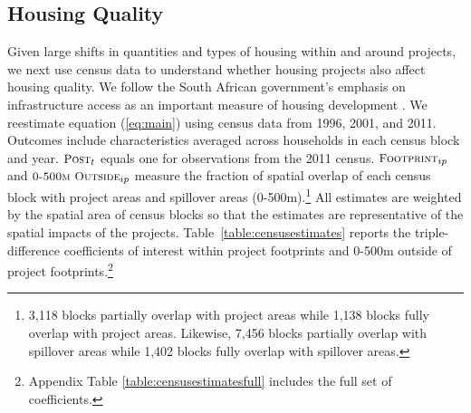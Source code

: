 \documentclass[12pt]{article}
\begin{document}
\subsection{Housing Quality}\label{section:resultscensus}

Given large shifts in quantities and types of housing within and around projects, we next use census data to understand whether housing projects also affect housing quality.  We follow the South African government's emphasis on infrastructure access as an important measure of housing development \citep{housingact}.  We reestimate equation (\ref{eq:main}) using census data from 1996, 2001, and 2011.  Outcomes include characteristics averaged across households in each census block and year.  $\textsc{\small Post}_{t}$ equals one for observations from the 2011 census.  $\textsc{\small Footprint}_{ip}$ and $\textsc{\small 0-500m Outside}_{ip}$ measure the fraction of spatial overlap of each census block with project areas and spillover areas (0-500m).\footnote{3,118 blocks partially overlap with project areas while 1,138 blocks fully overlap with project areas.  Likewise, 7,456 blocks partially overlap with spillover areas while 1,402 blocks fully overlap with spillover areas.}  All estimates are weighted by the spatial area of census blocks so that the estimates are representative of the spatial impacts of the projects.  Table~\ref{table:censusestimates} reports the triple-difference coefficients of interest within project footprints and 0-500m outside of project footprints.\footnote{Appendix Table \ref{table:censusestimatesfull} includes the full set of coefficients.}
\end{document}
